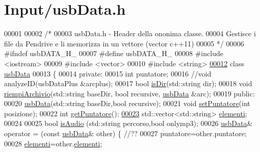 \hypertarget{usbData_8h_source}{\section{\-Input/usb\-Data.h}
}

\begin{DoxyCode}
00001 
00002 \textcolor{comment}{/*}
00003 \textcolor{comment}{    usbData.h - Header della ononima classe.}
00004 \textcolor{comment}{    Gestisce i file da Pendrive e li memorizza in un vettore (vector c++11)}
00005 \textcolor{comment}{*/}
00006 \textcolor{preprocessor}{#ifndef usbDATA\_H\_}
00007 \textcolor{preprocessor}{}\textcolor{preprocessor}{#define usbDATA\_H\_}
00008 \textcolor{preprocessor}{}\textcolor{preprocessor}{#include <iostream>}
00009 \textcolor{preprocessor}{#include <vector>}
00010 \textcolor{preprocessor}{#include <string>}
\hypertarget{usbData_8h_source_l00012}{}\hyperlink{classusbData}{00012} \textcolor{keyword}{class }\hyperlink{classusbData}{usbData}
00013 \{
00014 \textcolor{keyword}{private}:
00015     \textcolor{keywordtype}{int} puntatore;
00016     \textcolor{comment}{//void analyzeID(usbDataPlus &arcplus);}
00017     \textcolor{keywordtype}{bool} \hyperlink{classusbData_a2b695019bdabc6eed11dafaa7c959029}{isDir}(std::string dir); 
00018     \textcolor{keywordtype}{void} \hyperlink{classusbData_ad2e65d4a17a15b8885ae7d78e12aa2db}{riempiArchivio}(std::string baseDir, \textcolor{keywordtype}{bool} recursive, \hyperlink{classusbData}{usbData} &arc); 
00019 \textcolor{keyword}{public}:
00020     \hyperlink{classusbData_afd7ef352616d15a05bca0e56f46e52a0}{usbData}(std::string baseDir,\textcolor{keywordtype}{bool} recursive);
00021     \textcolor{keywordtype}{void} \hyperlink{classusbData_a7fc551ced09d43cb53c94ca9f154c6a9}{setPuntatore}(\textcolor{keywordtype}{int} posizione); 
00022     \textcolor{keywordtype}{int} \hyperlink{classusbData_a3d872ce11202a145b83f0791d7eefebb}{getPuntatore}(); 
\hypertarget{usbData_8h_source_l00023}{}\hyperlink{classusbData_ab0a9963ce896605e7e988e01e6efe1ba}{00023}     std::vector<std::string> \hyperlink{classusbData_ab0a9963ce896605e7e988e01e6efe1ba}{elementi}; 
00024 
00025     \textcolor{keywordtype}{bool} \hyperlink{classusbData_a7405fda9e90402594fe24dc091bad0ec}{isAudio} (std::string percorso,\textcolor{keywordtype}{bool} onlymp3); 
00026     \hyperlink{classusbData}{usbData}& operator = (\textcolor{keyword}{const} \hyperlink{classusbData}{usbData}& other) \{ \textcolor{comment}{//??}
00027         puntatore=other.puntatore;
00028         \hyperlink{classusbData_ab0a9963ce896605e7e988e01e6efe1ba}{elementi}=other.\hyperlink{classusbData_ab0a9963ce896605e7e988e01e6efe1ba}{elementi};

\end{DoxyCode}
